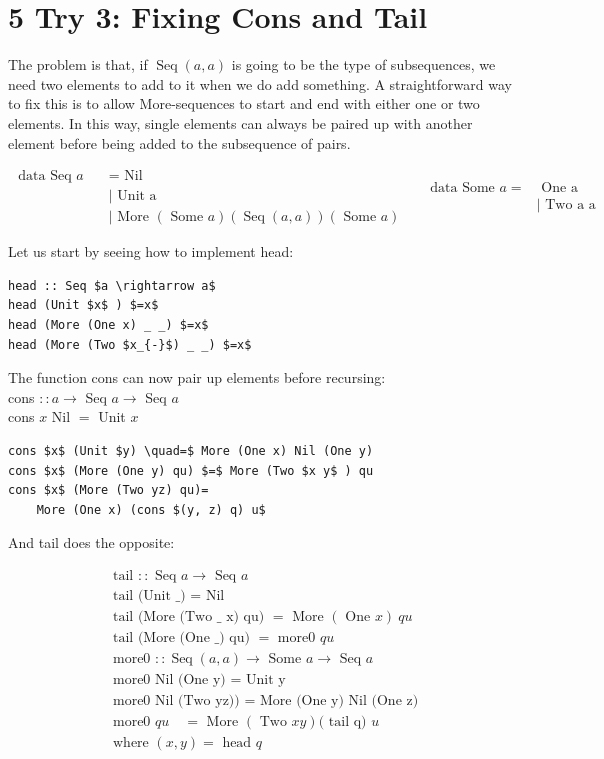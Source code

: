 \documentclass[10pt]{article}
\begin{document}
\section*{5 Try 3: Fixing Cons and Tail}
The problem is that, if $\operatorname{Seq}(a, a)$ is going to be the type of subsequences, we need two elements to add to it when we do add something. A straightforward way to fix this is to allow More-sequences to start and end with either one or two elements. In this way, single elements can always be paired up with another element before being added to the subsequence of pairs.

$$
\begin{aligned}
\text { data Seq } a \quad & =\text { Nil } \\
& \mid \text { Unit a } \\
& \mid \text { More }(\text { Some } a)(\operatorname{Seq}(a, a))(\text { Some } a)
\end{aligned} \quad \begin{aligned}
\text { data Some } a= & \text { One a } \\
& \mid \text { Two a a }
\end{aligned}
$$

Let us start by seeing how to implement head:

\begin{verbatim}
head :: Seq $a \rightarrow a$
head (Unit $x$ ) $=x$
head (More (One x) _ _) $=x$
head (More (Two $x_{-}$) _ _) $=x$
\end{verbatim}

The function cons can now pair up elements before recursing:\\
cons $:: a \rightarrow$ Seq $a \rightarrow$ Seq $a$\\
cons $x$ Nil $=$ Unit $x$

\begin{verbatim}
cons $x$ (Unit $y) \quad=$ More (One x) Nil (One y)
cons $x$ (More (One y) qu) $=$ More (Two $x y$ ) qu
cons $x$ (More (Two yz) qu)=
    More (One x) (cons $(y, z) q) u$
\end{verbatim}

And tail does the opposite:

$$
\begin{aligned}
& \text { tail }:: \text { Seq } a \rightarrow \text { Seq } a \\
& \text { tail (Unit _) = Nil } \\
& \text { tail (More (Two _ x) qu) }=\text { More }(\text { One } x) ~ q u \\
& \text { tail (More (One _) qu) }=\text { more0 } q u \\
& \text { more0 }:: \operatorname{Seq}(a, a) \rightarrow \text { Some } a \rightarrow \text { Seq } a \\
& \text { more0 Nil (One y) = Unit y } \\
& \text { more0 Nil (Two yz)) = More (One y) Nil (One z) } \\
& \text { more0 } q u \quad=\text { More }(\text { Two } x y)(\text { tail q) } u \\
& \text { where }(x, y)=\text { head } q
\end{aligned}
$$
\end{document}
